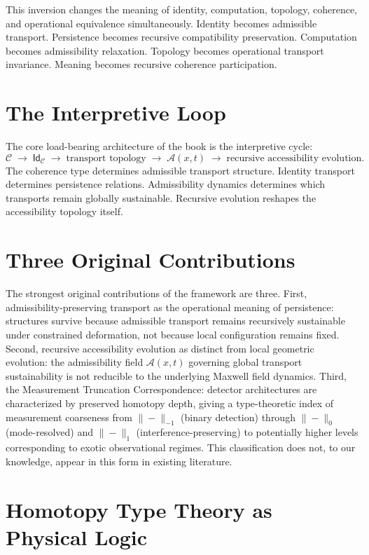 \documentclass[11pt,openany]{book}
\theoremstyle{definition}
\theoremstyle{plain}
\newcommand{\idtype}{\mathsf{Id}}
\newcommand{\Afield}{\mathcal{A}}
\begin{document}
This inversion changes the meaning of identity, computation, topology, coherence, and operational equivalence simultaneously. Identity becomes admissible transport. Persistence becomes recursive compatibility preservation. Computation becomes admissibility relaxation. Topology becomes operational transport invariance. Meaning becomes recursive coherence participation.

\section{The Interpretive Loop}

The core load-bearing architecture of the book is the interpretive cycle:
\[
\mathcal{C}
\;\longrightarrow\;
\idtype_{\mathcal{C}}
\;\longrightarrow\;
\text{transport topology}
\;\longrightarrow\;
\Afield(x,t)
\;\longrightarrow\;
\text{recursive accessibility evolution.}
\]
The coherence type determines admissible transport structure. Identity transport determines persistence relations. Admissibility dynamics determines which transports remain globally sustainable. Recursive evolution reshapes the accessibility topology itself.

\section{Three Original Contributions}

The strongest original contributions of the framework are three. First, admissibility-preserving transport as the operational meaning of persistence: structures survive because admissible transport remains recursively sustainable under constrained deformation, not because local configuration remains fixed. Second, recursive accessibility evolution as distinct from local geometric evolution: the admissibility field $\Afield(x,t)$ governing global transport sustainability is not reducible to the underlying Maxwell field dynamics. Third, the Measurement Truncation Correspondence: detector architectures are characterized by preserved homotopy depth, giving a type-theoretic index of measurement coarseness from $\|-\|_{-1}$ (binary detection) through $\|-\|_0$ (mode-resolved) and $\|-\|_1$ (interference-preserving) to potentially higher levels corresponding to exotic observational regimes. This classification does not, to our knowledge, appear in this form in existing literature.

\section{Homotopy Type Theory as Physical Logic}
\end{document}
